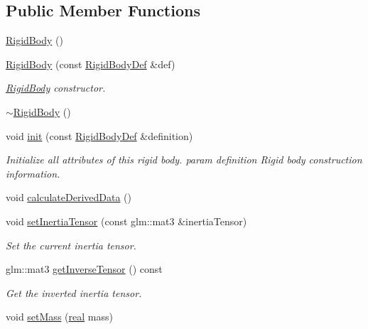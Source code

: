 \subsection*{Public Member Functions}
\begin{DoxyCompactItemize}
\item 
\mbox{\hyperlink{classr3_1_1_rigid_body_a8acb625440a10d83a87e9139bc9429d5}{Rigid\+Body}} ()
\item 
\mbox{\hyperlink{classr3_1_1_rigid_body_a5d12d73e66bca3b95a9597f064fa9d56}{Rigid\+Body}} (const \mbox{\hyperlink{structr3_1_1_rigid_body_def}{Rigid\+Body\+Def}} \&def)
\begin{DoxyCompactList}\small\item\em \mbox{\hyperlink{classr3_1_1_rigid_body}{Rigid\+Body}} constructor. \end{DoxyCompactList}\item 
\mbox{\hyperlink{classr3_1_1_rigid_body_a84d30e7e97d0341c08f58efc8ec60532}{$\sim$\+Rigid\+Body}} ()
\item 
void \mbox{\hyperlink{classr3_1_1_rigid_body_aa617fb4da3d5aeec43e04983765f7db6}{init}} (const \mbox{\hyperlink{structr3_1_1_rigid_body_def}{Rigid\+Body\+Def}} \&definition)
\begin{DoxyCompactList}\small\item\em Initialize all attributes of this rigid body. param definition Rigid body construction information. \end{DoxyCompactList}\item 
void \mbox{\hyperlink{classr3_1_1_rigid_body_addae07b8e8842e78012c5f3825e5185a}{calculate\+Derived\+Data}} ()
\item 
void \mbox{\hyperlink{classr3_1_1_rigid_body_a01092f4ae330b7fd13421d8c8177a30e}{set\+Inertia\+Tensor}} (const glm\+::mat3 \&inertia\+Tensor)
\begin{DoxyCompactList}\small\item\em Set the current inertia tensor. \end{DoxyCompactList}\item 
glm\+::mat3 \mbox{\hyperlink{classr3_1_1_rigid_body_a8a99ed119357d0cec8b77dfcb169dfab}{get\+Inverse\+Tensor}} () const
\begin{DoxyCompactList}\small\item\em Get the inverted inertia tensor. \end{DoxyCompactList}\item 
void \mbox{\hyperlink{classr3_1_1_rigid_body_a84c88437d863261773c9514d87bbc56a}{set\+Mass}} (\mbox{\hyperlink{namespacer3_ab2016b3e3f743fb735afce242f0dc1eb}{real}} mass)

\end{DoxyCompactItemize}
